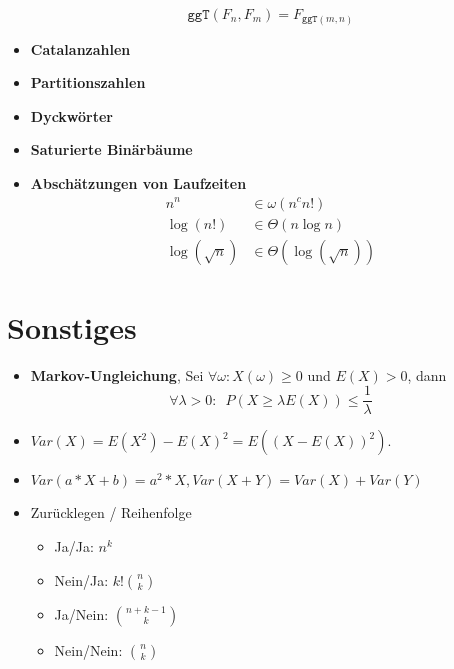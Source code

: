 \documentclass[landscape, 8pt, a4paper]{extarticle}
\newcommand{\ggT}{\texttt{ggT}}
\begin{document}
\begin{multicols}{3}
\begin{itemize}
		\begin{equation*}
			\ggT(F_n,F_m)=F_{\ggT(m,n)}
		\end{equation*}

		\item \textbf{Catalanzahlen}

		\item \textbf{Partitionszahlen}

		\item \textbf{Dyckwörter}

		\item \textbf{Saturierte Binärbäume}

		\item \textbf{Abschätzungen von Laufzeiten}
		\begin{align*}
			n^n&\in \omega(n^c n!)\\
			\log(n!)&\in\Theta (n\log n)\\
			\log(\sqrt n)&\in \Theta(\log(\sqrt n))
		\end{align*}

	\end{itemize}

	\section{Sonstiges}
	\begin{itemize}
		\item \textbf{Markov-Ungleichung}, Sei $\forall \omega: X(\omega)\geq 0$ und $E(X)>0$, dann
		\begin{equation*}
			\forall \lambda >0: \enspace P(X\geq \lambda E(X))\leq \frac 1\lambda
		\end{equation*}

		\item $Var(X)=E(X^2)-E(X)^2=E((X-E(X))^2)$.
		\item $Var(a*X+b)=a^2*X, Var(X+Y)=Var(X)+Var(Y)$

		\item Zurücklegen / Reihenfolge
		\begin{itemize}
			\item Ja/Ja: $n^k$
			\item Nein/Ja: $k!\binom nk$
			\item Ja/Nein: $\binom{n+k-1}{k}$
			\item Nein/Nein: $\binom nk$
		\end{itemize}
	\end{itemize}
\end{multicols}
\end{document}
